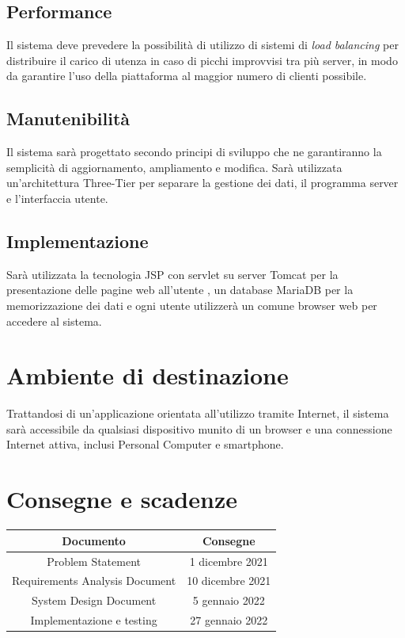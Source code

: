 \documentclass[12pt,a4paper]{article}
\begin{document}
\subsection{Performance}
Il sistema deve prevedere la possibilità di utilizzo di sistemi di \textit{load balancing} per distribuire il carico di utenza in caso di picchi improvvisi tra più server, in modo da garantire l'uso della piattaforma al maggior numero di clienti possibile.

\subsection{Manutenibilità}
Il sistema sarà progettato secondo principi di sviluppo che ne garantiranno la semplicità di aggiornamento, ampliamento e modifica.
Sarà utilizzata un'architettura Three-Tier per separare la gestione dei dati, il programma server e l'interfaccia utente.

\subsection{Implementazione}
Sarà utilizzata la tecnologia JSP con servlet su server Tomcat per la presentazione delle pagine web all'utente , un database MariaDB per la memorizzazione dei dati e ogni utente utilizzerà un comune browser web per accedere al sistema.

\section{Ambiente di destinazione}

Trattandosi di un'applicazione orientata all'utilizzo tramite Internet, il sistema sarà accessibile da qualsiasi dispositivo munito di un browser e una connessione Internet attiva, inclusi Personal Computer e smartphone.

\section{Consegne e scadenze}

\begin{center}
\begin{tabular} {| c | c |}
\hline
\textbf{Documento} & \textbf{Consegne} \\
\hline
Problem Statement & 1 dicembre 2021 \\
Requirements Analysis Document & 10 dicembre 2021 \\
System Design Document & 5 gennaio 2022 \\
Implementazione e testing & 27 gennaio 2022 \\
\hline
\end{tabular}
\end{center}
\end{document}
